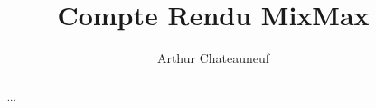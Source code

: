 \documentclass{egpubl}
\title[EG \LaTeX\ Author Guidelines]%
{Compte Rendu MixMax}
\author{Arthur Chateauneuf}
\begin{document}
\newcommand{\subf}[2]{%
    \begin{tabular}[t]{@{}c@{}}%
        #1 \\
        \small #2%
    \end{tabular}%
}


\maketitle
\begin{abstract}
    ...
\end{abstract}
\end{document}
